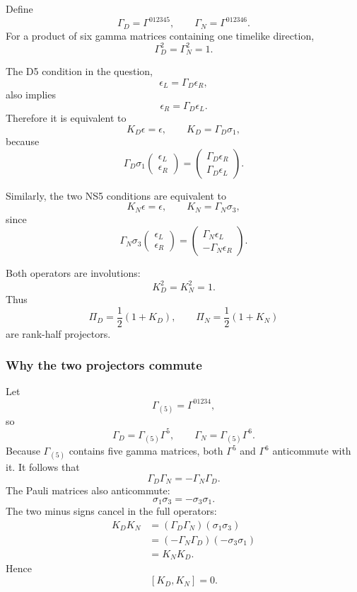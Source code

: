\documentclass[
  10pt,
  a4paper,
  openany]{book}
\begin{document}
Define \[
\Gamma_D=\Gamma^{012345},
\qquad
\Gamma_N=\Gamma^{012346}.
\] For a product of six gamma matrices containing one timelike
direction, \[
\Gamma_D^2=\Gamma_N^2=1.
\]

The D5 condition in the question, \[
\epsilon_L=\Gamma_D\epsilon_R,
\] also implies \[
\epsilon_R=\Gamma_D\epsilon_L.
\] Therefore it is equivalent to \[
K_D\epsilon=\epsilon,
\qquad
K_D=\Gamma_D\sigma_1,
\] because \[
\Gamma_D\sigma_1
\begin{pmatrix}
\epsilon_L\\
\epsilon_R
\end{pmatrix}
=
\begin{pmatrix}
\Gamma_D\epsilon_R\\
\Gamma_D\epsilon_L
\end{pmatrix}.
\]

Similarly, the two NS5 conditions are equivalent to \[
K_N\epsilon=\epsilon,
\qquad
K_N=\Gamma_N\sigma_3,
\] since \[
\Gamma_N\sigma_3
\begin{pmatrix}
\epsilon_L\\
\epsilon_R
\end{pmatrix}
=
\begin{pmatrix}
\Gamma_N\epsilon_L\\
-\Gamma_N\epsilon_R
\end{pmatrix}.
\]

Both operators are involutions: \[
K_D^2=K_N^2=1.
\] Thus \[
\Pi_D=\frac12(1+K_D),
\qquad
\Pi_N=\frac12(1+K_N)
\] are rank-half projectors.

\subsubsection{Why the two projectors
commute}\label{why-the-two-projectors-commute}

Let \[
\Gamma_{(5)}=\Gamma^{01234},
\] so \[
\Gamma_D=\Gamma_{(5)}\Gamma^5,
\qquad
\Gamma_N=\Gamma_{(5)}\Gamma^6.
\] Because \(\Gamma_{(5)}\) contains five gamma matrices, both
\(\Gamma^5\) and \(\Gamma^6\) anticommute with it. It follows that \[
\Gamma_D\Gamma_N=-\Gamma_N\Gamma_D.
\] The Pauli matrices also anticommute: \[
\sigma_1\sigma_3=-\sigma_3\sigma_1.
\] The two minus signs cancel in the full operators: \[
\begin{aligned}
K_DK_N
&=(\Gamma_D\Gamma_N)(\sigma_1\sigma_3)\\
&=(-\Gamma_N\Gamma_D)(-\sigma_3\sigma_1)\\
&=K_NK_D.
\end{aligned}
\] Hence \[
[K_D,K_N]=0.
\]
\end{document}
